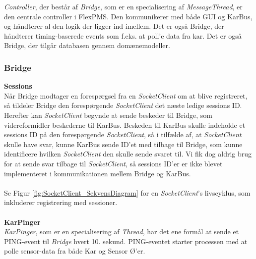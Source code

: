 \textit{Controller}, der består af \textit{Bridge}, som er en specialisering af \textit{MessageThread}, er den centrale controller i FlexPMS. Den kommunikerer med både GUI og KarBus, og håndterer al den logik der ligger ind imellem. Det er også Bridge, der håndterer timing-baserede events som f.eks. at poll'e data fra kar. Det er også Bridge, der tilgår databasen gennem domænemodeller.


\subsubsection{Bridge}


\textbf{Sessions}\\
Når Bridge modtager en forespørgsel fra en \textit{SocketClient} om at blive registreret, så tildeler Bridge den forespørgende \textit{SocketClient} det næste ledige sessions ID. Herefter kan \textit{SocketClient} begynde at sende beskeder til Bridge, som videreformidler beskederne til KarBus. Beskeden til KarBus skulle indeholde et sessions ID på den forespørgende \textit{SocketClient}, så i tilfælde af, at \textit{SocketClient} skulle have svar, kunne KarBus sende ID’et med tilbage til Bridge, som kunne identificere hvilken \textit{SocketClient} den skulle sende svaret til. Vi fik dog aldrig brug for at sende svar tilbage til \textit{SocketClient}, så sessions ID'er er ikke blevet implementeret i kommunikationen mellem Bridge og KarBus.\\\\

Se Figur \ref{fig:SocketClient_SekvensDiagram} for en \textit{SocketClient}'s livscyklus, som inkluderer registrering med sessioner.\\\\

\textbf{KarPinger}\\
\textit{KarPinger}, som er en specialisering af \textit{Thread}, har det ene formål at sende et PING-event til \textit{Bridge} hvert 10. sekund. PING-eventet starter processen med at polle sensor-data fra både Kar og Sensor Ø'er.

